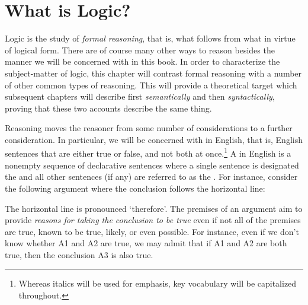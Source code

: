 

\chapter{What is Logic?}
\label{ch.introduction}

Logic is the study of \textit{formal reasoning}, that is, what follows from what in virtue of logical form.
There are of course many other ways to reason besides the manner we will be concerned with in this book.
In order to characterize the subject-matter of logic, this chapter will contrast formal reasoning with a number of other common types of reasoning.
This will provide a theoretical target which subsequent chapters will describe first \textit{semantically} and then \textit{syntactically}, proving that these two accounts describe the same thing.

Reasoning moves the reasoner from some number of considerations to a further consideration.
In particular, we will be concerned with  in English, that is, English sentences that are either true or false, and not both at once.\footnote{Whereas italics will be used for emphasis, key vocabulary will be capitalized throughout.}
A  in English is a nonempty sequence of declarative sentences where a single sentence is designated the  and all other sentences (if any) are referred to as the .
For instance, consider the following argument where the conclusion follows the horizontal line:

\begin{earg}
\end{earg}

The horizontal line is pronounced `therefore'.
The premises of an argument aim to provide \textit{reasons for taking the conclusion to be true} even if not all of the premises are true, known to be true, likely, or even possible.
For instance, even if we don't know whether A1 and A2 are true, we may admit that if A1 and A2 are both true, then the conclusion A3 is also true.

